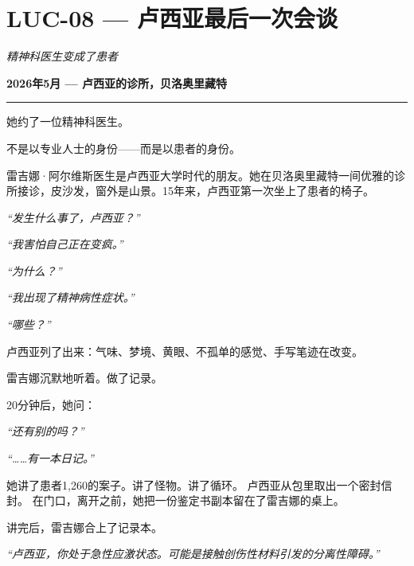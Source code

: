 \section*{\textbf{LUC-08} --- 卢西亚最后一次会谈}

\noindent \textit{精神科医生变成了患者}

\noindent \textbf{2026年5月 --- 卢西亚的诊所，贝洛奥里藏特}

\vspace{0.5em}\noindent\rule{\textwidth}{0.5pt}\vspace{0.5em}

\noindent 她约了一位精神科医生。

\noindent 不是以专业人士的身份——而是以患者的身份。

\noindent 雷吉娜·阿尔维斯医生是卢西亚大学时代的朋友。她在贝洛奥里藏特一间优雅的诊所接诊，皮沙发，窗外是山景。15年来，卢西亚第一次坐上了患者的椅子。

\noindent \textit{\textquotedblleft{}发生什么事了，卢西亚？\textquotedblright{}}

\noindent \textit{\textquotedblleft{}我害怕自己正在变疯。\textquotedblright{}}

\noindent \textit{\textquotedblleft{}为什么？\textquotedblright{}}

\noindent \textit{\textquotedblleft{}我出现了精神病性症状。\textquotedblright{}}

\noindent \textit{\textquotedblleft{}哪些？\textquotedblright{}}

\noindent 卢西亚列了出来：气味、梦境、黄眼、不孤单的感觉、手写笔迹在改变。

\noindent 雷吉娜沉默地听着。做了记录。

\noindent 20分钟后，她问：

\noindent \textit{\textquotedblleft{}还有别的吗？\textquotedblright{}}

\noindent \textit{\textquotedblleft{}……有一本日记。\textquotedblright{}}

\noindent 她讲了患者1,260的案子。讲了怪物。讲了循环。
\noindent 卢西亚从包里取出一个密封信封。
\noindent 在门口，离开之前，她把一份鉴定书副本留在了雷吉娜的桌上。

\noindent 讲完后，雷吉娜合上了记录本。

\noindent \textit{\textquotedblleft{}卢西亚，你处于急性应激状态。可能是接触创伤性材料引发的分离性障碍。\textquotedblright{}}

